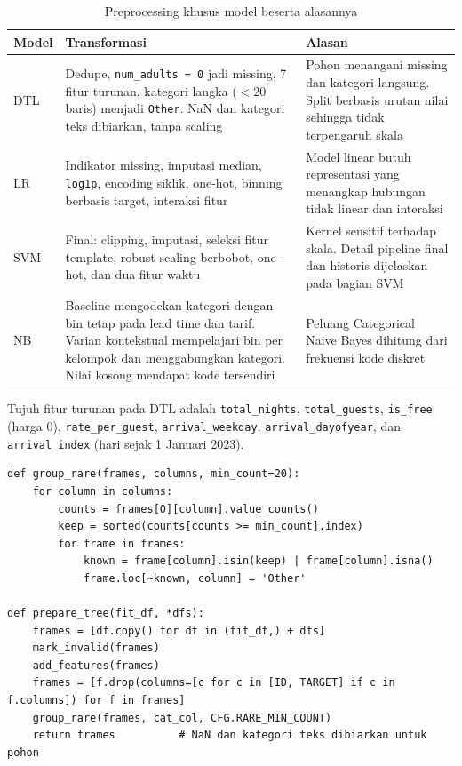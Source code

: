 \begin{table}[H]
\centering
\caption{Preprocessing khusus model beserta alasannya}
\label{tab:prep_model}
\begin{tabularx}{\textwidth}{>{\raggedright\arraybackslash}p{2.4cm}>{\raggedright\arraybackslash}p{5.6cm}X}
\toprule
Model & Transformasi & Alasan \\
\midrule
DTL & Dedupe, \texttt{num\_adults = 0} jadi missing, 7 fitur turunan, kategori langka ($<20$ baris) menjadi \texttt{Other}. NaN dan kategori teks dibiarkan, tanpa scaling & Pohon menangani missing dan kategori langsung. Split berbasis urutan nilai sehingga tidak terpengaruh skala \\
LR & Indikator missing, imputasi median, \texttt{log1p}, encoding siklik, one-hot, binning berbasis target, interaksi fitur & Model linear butuh representasi yang menangkap hubungan tidak linear dan interaksi \\
SVM & Final: clipping, imputasi, seleksi fitur template, robust scaling berbobot, one-hot, dan dua fitur waktu & Kernel sensitif terhadap skala. Detail pipeline final dan historis dijelaskan pada bagian SVM \\
NB & Baseline mengodekan kategori dengan bin tetap pada lead time dan tarif. Varian kontekstual mempelajari bin per kelompok dan menggabungkan kategori. Nilai kosong mendapat kode tersendiri & Peluang Categorical Naive Bayes dihitung dari frekuensi kode diskret \\
\bottomrule
\end{tabularx}
\end{table}

Tujuh fitur turunan pada DTL adalah \texttt{total\_nights}, \texttt{total\_guests}, \texttt{is\_free} (harga 0), \texttt{rate\_per\_guest}, \texttt{arrival\_weekday}, \texttt{arrival\_dayofyear}, dan \texttt{arrival\_index} (hari sejak 1 Januari 2023).

\begin{lstlisting}[caption={Preprocessing DTL (\texttt{src/experiments/dtl/})}, label={lst:prepare_tree}]
def group_rare(frames, columns, min_count=20):
    for column in columns:
        counts = frames[0][column].value_counts()
        keep = sorted(counts[counts >= min_count].index)
        for frame in frames:
            known = frame[column].isin(keep) | frame[column].isna()
            frame.loc[~known, column] = 'Other'

def prepare_tree(fit_df, *dfs):
    frames = [df.copy() for df in (fit_df,) + dfs]
    mark_invalid(frames)
    add_features(frames)
    frames = [f.drop(columns=[c for c in [ID, TARGET] if c in f.columns]) for f in frames]
    group_rare(frames, cat_col, CFG.RARE_MIN_COUNT)
    return frames          # NaN dan kategori teks dibiarkan untuk pohon
\end{lstlisting}

